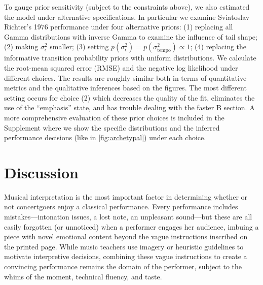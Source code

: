 \documentclass[aoas]{imsart}
\begin{document}
To gauge prior sensitivity (subject to the constraints above), we also
estimated the model under alternative specifications. In particular we
examine Sviatoslav Richter's 
1976 performance under four alternative priors: (1) replacing
all Gamma distributions with inverse Gamma to examine the influence
of tail shape; (2) making $\sigma^2_\epsilon$ smaller; (3) setting
$p(\sigma^2_\epsilon)=p(\sigma^2_{\textrm{tempo}}) \propto 1$; (4)
replacing the informative transition probability priors with uniform
distributions. We calculate the root-mean squared error (RMSE) and
the negative log likelihood under different choices. The results are
roughly similar both in terms of quantitative metrics and the
qualitative inferences based on the figures. The most different
setting occurs for choice (2) which decreases the quality of the fit,
eliminates the use of the ``emphasis'' state, and has trouble dealing
with the faster B section. A more comprehensive evaluation of these prior choices is included in the
Supplement where we show the specific distributions and the
inferred performance decisions (like in \autoref{fig:archetypal})
under each choice.

\section{Discussion}
\label{sec:discussion}


Musical interpretation is the most important factor 
in determining whether or not concertgoers enjoy a classical performance. Every
performance includes mistakes---intonation issues, a lost note, an
unpleasant sound---but these are all easily forgotten (or unnoticed) when a performer
engages her audience, imbuing a piece with novel emotional content
beyond the vague instructions inscribed on the printed page. While music teachers use
imagery or heuristic guidelines to motivate interpretive decisions, combining these
vague instructions to create a convincing performance remains the domain
of the performer, subject to the whims of the moment, technical
fluency, and taste.
\end{document}
